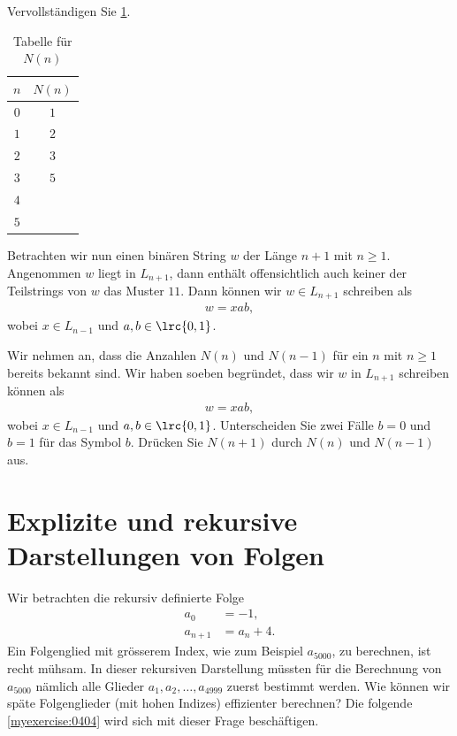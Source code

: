 \begin{myexercise}\label{myexercise:0402}
	Vervollständigen Sie \cref{table:Nn}.
	\begin{table}[H]
		\begin{center}
			\begin{tabular}{c|c}
				$n$ & $N(n)$ \\ \hline
				$0$ & $1$    \\
				$1$ & $2$    \\
				$2$ & $3$    \\
				$3$ & $5$    \\
				$4$ &        \\
				$5$ &        \\
			\end{tabular}
		\end{center}
		\caption{Tabelle für $N(n)$}
		\label{table:Nn}
	\end{table}
\end{myexercise}
\noindent
Betrachten wir nun einen binären String $w$ der Länge $n+1$ mit $n\geq 1$. Angenommen $w$ liegt in $L_{n+1}$, dann enthält offensichtlich auch keiner der Teilstrings von $w$ das Muster $11$. Dann können wir $w\in L_{n+1}$ schreiben als
\begin{align*}
	w = xab,
\end{align*}
wobei $x\in L_{n-1}$ und $a,b\in\lrc{0,1}$.

\begin{myexercise}\label{myexercise:0403}
	Wir nehmen an, dass die Anzahlen $N(n)$ und $N(n-1)$ für ein $n$ mit $n\geq 1$ bereits bekannt sind. Wir haben soeben begründet, dass wir $w$ in $L_{n+1}$ schreiben können als
	\begin{align*}
		w = xab,
	\end{align*}
	wobei $x\in L_{n-1}$ und $a,b\in\lrc{0,1}$. Unterscheiden Sie zwei Fälle $b = 0$ und $b = 1$ für das Symbol $b$. Drücken Sie $N(n+1)$ durch $N(n)$ und $N(n-1)$ aus.
\end{myexercise}

\section{Explizite und rekursive Darstellungen von Folgen}
Wir betrachten die rekursiv definierte Folge
\begin{align*}
	a_0     & = -1,      \\
	a_{n+1} & = a_n + 4.
\end{align*}
Ein Folgenglied mit grösserem Index, wie zum Beispiel $a_{5000}$, zu berechnen, ist recht mühsam. In dieser rekursiven Darstellung müssten für die Berechnung von
$a_{5000}$ nämlich alle Glieder $a_{1}, a_{2}, \ldots, a_{4999}$ zuerst bestimmt werden. Wie können wir späte Folgenglieder (mit hohen Indizes) effizienter berechnen? Die folgende \cref{myexercise:0404} wird sich mit dieser Frage beschäftigen.

